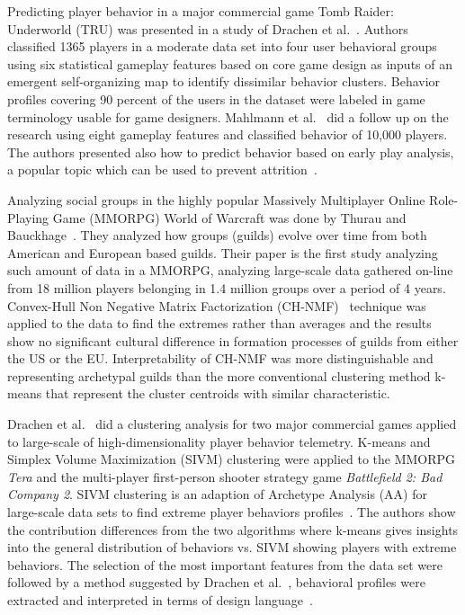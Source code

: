 Predicting player behavior in a major commercial game Tomb Raider: Underworld (TRU) was presented in a study of Drachen et al.~\citep{Drachen:2009Tomb}. Authors classified 1365 players in a moderate data set into four user behavioral groups using six statistical gameplay features based on core game design as inputs of an emergent self-organizing map to identify dissimilar behavior clusters. Behavior profiles covering 90 percent of the users in the dataset were labeled in game terminology usable for game designers. Mahlmann et al.~\citep{Mahlmann:2010Tomb} did a follow up on the research using eight gameplay features and classified behavior of 10,000 players. The authors presented also how to predict behavior based on early play analysis, a popular topic which can be used to prevent attrition~\citep{Fields:2011SocialGame}.

Analyzing social groups in the highly popular Massively Multiplayer Online Role-Playing Game (MMORPG) World of Warcraft was done by Thurau and Bauckhage~\citep{Thurau:2010WoW}. They analyzed how groups (guilds) evolve over time from both American and European based guilds. Their paper is the first study analyzing such amount of data in a MMORPG, analyzing large-scale data gathered on-line from 18 million players belonging in 1.4 million groups over a period of 4 years. Convex-Hull Non Negative Matrix Factorization (CH-NMF)~\citep{Thurau:2009SVIM} technique was applied to the data to find the extremes rather than averages and the results show  no significant cultural difference in formation processes of guilds from either the US or the EU. Interpretability of CH-NMF was more distinguishable and representing archetypal guilds than the more conventional clustering method k-means that represent the cluster centroids with similar characteristic.

Drachen et al.~\citep{Drachen:2012} did a clustering analysis for two major commercial games applied to large-scale of high-dimensionality player behavior telemetry. K-means and Simplex Volume Maximization (SIVM) clustering were applied to the MMORPG \textit{Tera} and the multi-player first-person shooter strategy game \textit{Battlefield 2: Bad Company 2}. SIVM clustering is an adaption of Archetype Analysis (AA) for large-scale data sets to find extreme player behaviors profiles~\citep{Thurau:2009SVIM, Kersting:2010SVIM}. The authors show the contribution differences from the two algorithms where k-means gives insights into the general distribution of behaviors vs. SIVM showing players with extreme behaviors. The selection of the most important features from the data set were followed by a method suggested by Drachen et al.~\citep{Drachen:2009Tomb}, behavioral profiles were extracted and interpreted in terms of design language~\citep{Drachen:2009Tomb, Zoeller:2010}.

